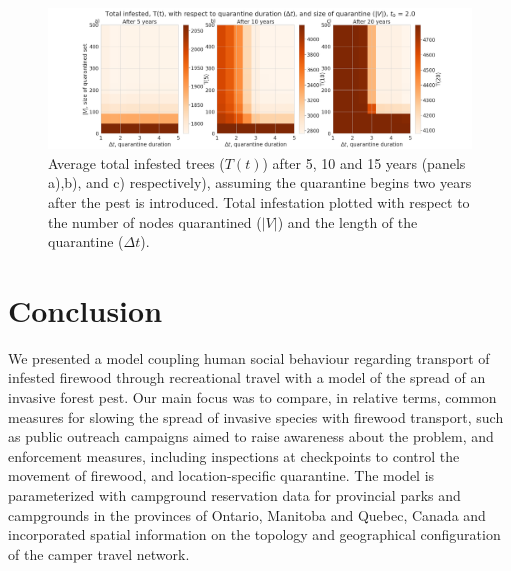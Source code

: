 \begin{figure}[!h]
    \centering
    \includegraphics[width =\textwidth]{chapter_2/node_quarantine_plot_2.0.png}
    \caption[Average total infested trees ($T(t)$) after 5, 10 and 15 years (panels a),b), and c) respectively), assuming the quarantine begins two years after the pest is introduced.]{Average total infested trees ($T(t)$) after 5, 10 and 15 years (panels a),b), and c) respectively), assuming the quarantine begins two years after the pest is introduced. Total infestation plotted with respect to the number of nodes quarantined ($|V|$) and the length of the quarantine ($\Delta t$).}
    \label{patch_quarantine_figure_t_1}
\end{figure}


\section{Conclusion}

We presented a model coupling human social behaviour regarding transport of infested firewood through recreational travel with a model of the spread of an invasive forest pest. Our main focus was to compare, in relative terms, common measures for slowing the spread of invasive species with firewood transport, such as public outreach campaigns aimed to raise awareness about the problem, and enforcement measures, including inspections at checkpoints to control the movement of firewood, and location-specific quarantine. The model is parameterized with campground reservation data for provincial parks and campgrounds in the provinces of Ontario, Manitoba and Quebec, Canada and incorporated spatial information on the topology and geographical configuration of the camper travel network.

